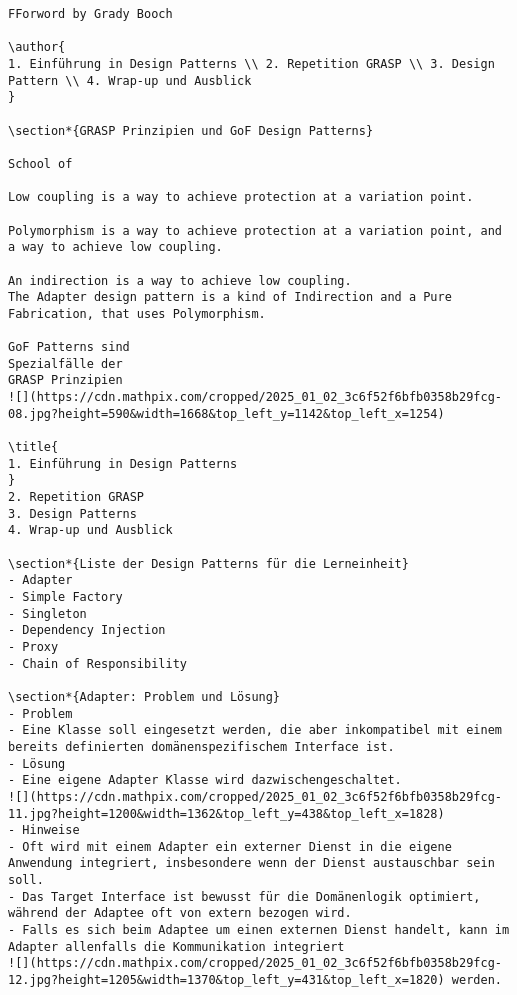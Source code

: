 \documentclass[10pt]{article}
\begin{document}
\begin{verbatim}
FForword by Grady Booch

\author{
1. Einführung in Design Patterns \\ 2. Repetition GRASP \\ 3. Design Pattern \\ 4. Wrap-up und Ausblick
}

\section*{GRASP Prinzipien und GoF Design Patterns}

School of

Low coupling is a way to achieve protection at a variation point.

Polymorphism is a way to achieve protection at a variation point, and a way to achieve low coupling.

An indirection is a way to achieve low coupling.
The Adapter design pattern is a kind of Indirection and a Pure Fabrication, that uses Polymorphism.

GoF Patterns sind
Spezialfälle der
GRASP Prinzipien
![](https://cdn.mathpix.com/cropped/2025_01_02_3c6f52f6bfb0358b29fcg-08.jpg?height=590&width=1668&top_left_y=1142&top_left_x=1254)

\title{
1. Einführung in Design Patterns
}
2. Repetition GRASP
3. Design Patterns
4. Wrap-up und Ausblick

\section*{Liste der Design Patterns für die Lerneinheit}
- Adapter
- Simple Factory
- Singleton
- Dependency Injection
- Proxy
- Chain of Responsibility

\section*{Adapter: Problem und Lösung}
- Problem
- Eine Klasse soll eingesetzt werden, die aber inkompatibel mit einem bereits definierten domänenspezifischem Interface ist.
- Lösung
- Eine eigene Adapter Klasse wird dazwischengeschaltet.
![](https://cdn.mathpix.com/cropped/2025_01_02_3c6f52f6bfb0358b29fcg-11.jpg?height=1200&width=1362&top_left_y=438&top_left_x=1828)
- Hinweise
- Oft wird mit einem Adapter ein externer Dienst in die eigene Anwendung integriert, insbesondere wenn der Dienst austauschbar sein soll.
- Das Target Interface ist bewusst für die Domänenlogik optimiert, während der Adaptee oft von extern bezogen wird.
- Falls es sich beim Adaptee um einen externen Dienst handelt, kann im Adapter allenfalls die Kommunikation integriert
![](https://cdn.mathpix.com/cropped/2025_01_02_3c6f52f6bfb0358b29fcg-12.jpg?height=1205&width=1370&top_left_y=431&top_left_x=1820) werden.


\end{verbatim}
\end{document}
